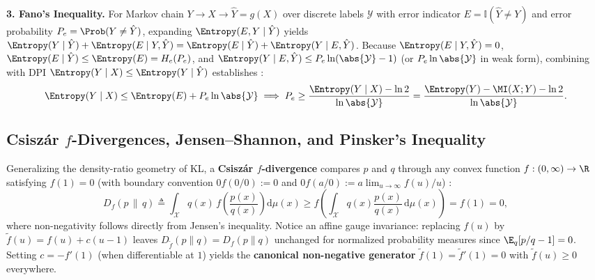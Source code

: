 \documentclass[../../../../master.tex]{subfiles}
\begin{document}
\begin{coremath}
\textbf{3. Fano's Inequality.} For Markov chain $Y \to X \to \hat{Y} = g(X)$ over discrete labels $\mathcal{Y}$ with error indicator $E = \mathbb{I}(\hat{Y} \ne Y)$ and error probability $P_e = \Prob(Y \ne \hat{Y})$, expanding $\Entropy(E, Y \mid \hat{Y})$ yields $\Entropy(Y \mid \hat{Y}) + \Entropy(E \mid Y, \hat{Y}) = \Entropy(E \mid \hat{Y}) + \Entropy(Y \mid E, \hat{Y})$. Because $\Entropy(E \mid Y, \hat{Y}) = 0$, $\Entropy(E \mid \hat{Y}) \le \Entropy(E) = H_e(P_e)$, and $\Entropy(Y \mid E, \hat{Y}) \le P_e \ln(\abs{\mathcal{Y}} - 1)$ (or $P_e \ln\abs{\mathcal{Y}}$ in weak form), combining with DPI $\Entropy(Y \mid X) \le \Entropy(Y \mid \hat{Y})$ establishes :
\begin{equation}
\label{eq:infotheory:fano}
  \Entropy(Y \mid X) \le \Entropy(E) + P_e \ln\abs{\mathcal{Y}}
  \implies
  P_e \ge \frac{\Entropy(Y \mid X) - \ln 2}{\ln\abs{\mathcal{Y}}}
  = \frac{\Entropy(Y) - \MI(X; Y) - \ln 2}{\ln\abs{\mathcal{Y}}}.
\end{equation}
\end{coremath}

\subsection{Csisz\'ar $f$-Divergences, Jensen--Shannon, and Pinsker's Inequality}

Generalizing the density-ratio geometry of KL, a \textbf{Csisz\'ar $f$-divergence} compares $p$ and $q$ through any convex function $f : (0, \infty) \to \R$ satisfying $f(1) = 0$ (with boundary convention $0 f(0/0) := 0$ and $0 f(a/0) := a\lim_{u\to\infty} f(u)/u$) :
\begin{equation}
\label{eq:infotheory:fdiv_def}
  D_f(p \,\|\, q) \triangleq \int_{\mathcal{X}} q(x)\, f\!\left(\frac{p(x)}{q(x)}\right) \mathrm{d}\mu(x) \ge f\!\left(\int_{\mathcal{X}} q(x)\frac{p(x)}{q(x)}\,\mathrm{d}\mu(x)\right) = f(1) = 0,
\end{equation}
where non-negativity follows directly from Jensen's inequality. Notice an affine gauge invariance: replacing $f(u)$ by $\tilde{f}(u) = f(u) + c(u - 1)$ leaves $D_{\tilde{f}}(p\|q) = D_f(p\|q)$ unchanged for normalized probability measures since $\E_q[p/q - 1] = 0$. Setting $c = -f'(1)$ (when differentiable at $1$) yields the \textbf{canonical non-negative generator} $\tilde{f}(1) = \tilde{f}'(1) = 0$ with $\tilde{f}(u) \ge 0$ everywhere.
\end{document}

